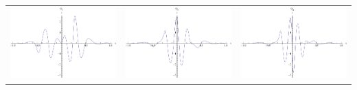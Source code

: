 \documentclass{article}
\begin{document}
\begin{landscape}
\begin{tabular}{ccc}
\includegraphics[width=6.7cm]{quintic_wavelet_4.pdf}& \includegraphics[width=6.7cm]{quintic_wavelet_5.pdf}& \includegraphics[width=6.7cm]{quintic_wavelet_6.pdf} \\
\end{tabular} 
 \end{landscape}
\end{document}
